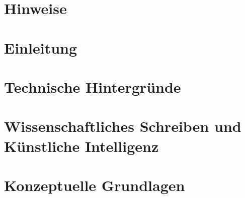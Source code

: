\documentclass[
	12pt, %
	a4paper,
	bibliography=totoc, %
	numbers=noenddot, %
	ngerman, %
	headsepline, %
	oneside %
	]{scrbook} %
\begin{document}
\chapter*{Hinweise}



\newpage

\tableofcontents{}


\listoffigures
{}





\printnoidxglossaries{}

\clearpage



\chapter{Einleitung}\label{ch:einleitung}


\chapter{Technische Hintergründe}\label{ch:technischeHintergründe}


\chapter{Wissenschaftliches Schreiben und Künstliche Intelligenz}\label{ch:wissenschaftlichesSchreibenUndKI}


\chapter{Konzeptuelle Grundlagen}\label{ch:anforderungen}

\end{document}

